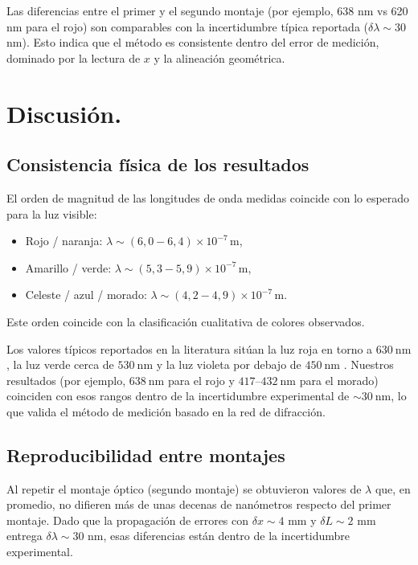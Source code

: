 \documentclass[11pt,twocolumn]{article}
\begin{document}
Las diferencias entre el primer y el segundo montaje (por ejemplo, 638 nm vs 620 nm para el rojo) son comparables con la incertidumbre típica reportada ($\delta\lambda \sim 30$ nm). Esto indica que el método es consistente dentro del error de medición, dominado por la lectura de $x$ y la alineación geométrica.


\section{Discusión.}

\subsection{Consistencia física de los resultados}
El orden de magnitud de las longitudes de onda medidas coincide con lo esperado para la luz visible:
\begin{itemize}
    \item Rojo / naranja: $\lambda \sim (6{,}0 - 6{,}4)\times10^{-7}\,\text{m}$,
    \item Amarillo / verde: $\lambda \sim (5{,}3 - 5{,}9)\times10^{-7}\,\text{m}$,
    \item Celeste / azul / morado: $\lambda \sim (4{,}2 - 4{,}9)\times10^{-7}\,\text{m}$.
\end{itemize}
Este orden coincide con la clasificación cualitativa de colores observados.

Los valores típicos reportados en la literatura sitúan la luz roja en torno a $630\ \text{nm}$, la luz verde cerca de $530\ \text{nm}$ y la luz violeta por debajo de $450\ \text{nm}$ \cite{hecht_optics,young_freedman}. Nuestros resultados (por ejemplo, $638\ \text{nm}$ para el rojo y $417$--$432\ \text{nm}$ para el morado) coinciden con esos rangos dentro de la incertidumbre experimental de $\sim 30\ \text{nm}$, lo que valida el método de medición basado en la red de difracción.


\subsection{Reproducibilidad entre montajes}
Al repetir el montaje óptico (segundo montaje) se obtuvieron valores de $\lambda$ que, en promedio, no difieren más de unas decenas de nanómetros respecto del primer montaje. Dado que la propagación de errores con $\delta x \sim 4$ mm y $\delta L \sim 2$ mm entrega $\delta\lambda \sim 30$ nm, esas diferencias están dentro de la incertidumbre experimental.
\end{document}
